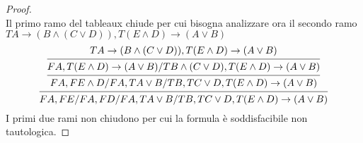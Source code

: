 \begin{proof}
\begin{equation*}
\end{equation*}
Il primo ramo del tableaux chiude per cui bisogna analizzare ora il secondo ramo
$T A \rightarrow (B \land (C \lor D)), T (E \land D) \rightarrow (A \lor B)$
\begin{equation*}
\begin{prooftree}
\hypo{T A \rightarrow (B \land (C \lor D)), T (E \land D) \rightarrow (A \lor B)}
\infer1{FA,T (E \land D) \rightarrow (A \lor B)/T B \land (C \lor D),T (E \land D) \rightarrow (A \lor B)}
\infer1{FA,F E \land D/FA,T A \lor B/TB,T C \lor D,T (E \land D) \rightarrow (A \lor B)}
\infer1{FA,FE/FA,FD/FA,T A \lor B/TB,T C \lor D,T (E \land D) \rightarrow (A \lor B)}
\end{prooftree}
\end{equation*}
I primi due rami non chiudono per cui la formula è soddisfacibile non tautologica.
\end{proof}

